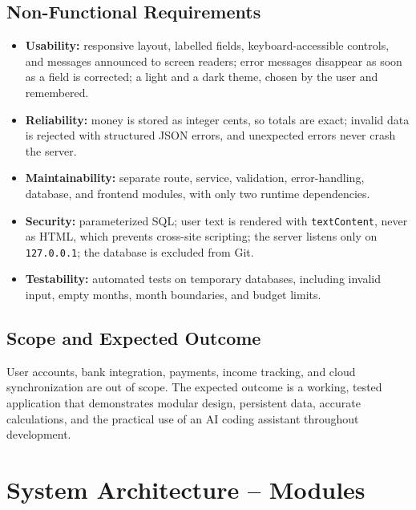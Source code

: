 \documentclass[11pt,a4paper]{article}
\begin{document}
\subsection{Non-Functional Requirements}

\begin{itemize}
    \item \textbf{Usability:} responsive layout, labelled fields,
    keyboard-accessible controls, and messages announced to screen
    readers; error messages disappear as soon as a field is corrected; a
    light and a dark theme, chosen by the user and remembered.
    \item \textbf{Reliability:} money is stored as integer cents, so
    totals are exact; invalid data is rejected with structured JSON
    errors, and unexpected errors never crash the server.
    \item \textbf{Maintainability:} separate route, service,
    validation, error-handling, database, and frontend modules, with
    only two runtime dependencies.
    \item \textbf{Security:} parameterized SQL; user text is rendered
    with \texttt{textContent}, never as HTML, which prevents cross-site
    scripting; the server listens only on \texttt{127.0.0.1}; the
    database is excluded from Git.
    \item \textbf{Testability:} automated tests on temporary databases,
    including invalid input, empty months, month boundaries, and budget
    limits.
\end{itemize}

\subsection{Scope and Expected Outcome}

User accounts, bank integration, payments, income tracking, and cloud
synchronization are out of scope. The expected outcome is a working,
tested application that demonstrates modular design, persistent data,
accurate calculations, and the practical use of an AI coding assistant
throughout development.


\section{System Architecture -- Modules}
\end{document}

